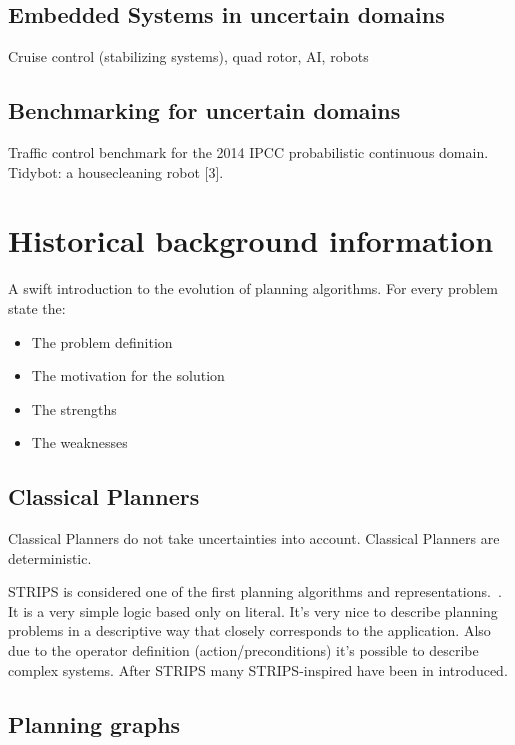 \documentclass[runningheads,a4paper]{llncs}
\begin{document}
\subsection{Embedded Systems in uncertain domains}

Cruise control (stabilizing systems), quad rotor, AI, robots

\subsection{Benchmarking for uncertain domains}

Traffic control benchmark for the 2014 IPCC probabilistic continuous domain.
Tidybot: a housecleaning robot [3]. \\


\section{Historical background information}
A swift introduction to the evolution of planning algorithms. For every problem state the:
\begin{itemize}
	\item The problem definition
	\item The motivation for the solution
	\item The strengths
	\item The weaknesses
\end{itemize}

\subsection{Classical Planners}

Classical Planners do not take uncertainties into account. Classical Planners
are deterministic.

STRIPS is considered one of the first planning algorithms and
representations.~\cite{lavalle2006planning}. It is a very simple logic based
only on literal. It's very nice to describe planning problems in a
descriptive way that closely corresponds to the application. Also due to the
operator definition (action/preconditions) it's possible to describe complex
systems. After STRIPS many STRIPS-inspired have been in introduced.

\subsection{Planning graphs}
\end{document}
